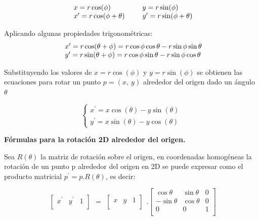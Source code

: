 $$
\begin{array}{rccl}
\begin{array}{l@{}l}
x = r \cos(\phi) \\
{x}^{\prime} = r \cos(\phi + \theta)
\end{array}
\end{array}
\ \ \ 
\begin{array}{rccl}
\begin{array}{l@{}l}
y = r \sin(\phi) \\
{y}^{\prime} = r \sin(\phi + \theta)
\end{array}
\end{array} 
$$



Aplicando algunas propiedades trigonométricas:
$$
\begin{array}{l@{}l}
{x}^{\prime} = r \cos(\theta + \phi) = r \cos \phi \cos \theta - r \sin \phi \sin \theta
\\
{y}^{\prime} = r \sin(\theta + \phi) = r \cos \phi \sin \theta - r \sin \phi \cos \theta
\end{array}
$$



Substituyendo los valores de $x = r \cos(\phi)$ y $y = r \sin(\phi)$ se obtienen las ecuaciones para rotar un punto $p = (x, \ y)$ alrededor del origen dado un ángulo $\theta$

\begin{equation}
\begin{cases}
{x}^{\prime} = x \cos(\theta) - y \sin(\theta) \\ 
{y}^{\prime} = x \sin(\theta) - y \cos(\theta)
\end{cases}
\end{equation}

\begin{center}
\textbf{\footnotesize{Fórmulas para la rotación 2D alrededor del origen.}}
\end{center}

Sea $R(\theta)$ la matriz de rotación sobre el origen, en coordenadas homogéneas la
rotación de un punto p alrededor del origen en 2D se puede expresar como el producto matricial $p^{\prime} = p.R(\theta)$, es decir:

\begin{equation}
\begin{array}{rccl}
\left[
\begin{array}{rccl}
{x}^{\prime} & {y}^{\prime} & 1\\
\end{array}
\right]
\end{array}
=
\begin{array}{rccl}
\left[
\begin{array}{rccl}
x & y &  1\\
\end{array}
\right]
\end{array} 
.
\left[
\begin{array}{rccl}
\cos\theta & \sin\theta & 0\\
-\sin\theta & \cos\theta & 0\\
0 & 0 & 1\\
\end{array}
\right]
\end{equation}

